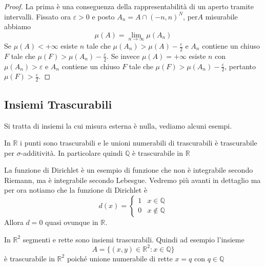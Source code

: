 \begin{proof}
    La prima è una conseguenza della rappresentabilità di un aperto tramite
intervalli. Fissato ora \(\varepsilon>0\) e posto \(A_{n} = A \cap
{(-n,n)}^{N}\), per\(A\) misurabile abbiamo
\[
    \mu(A) = \lim_{n \to \infty} \mu(A_{n})
\]
Se \(\mu(A) < +\infty\) esiste \(n\) tale che \(\mu(A_{n}) > \mu(A) -
\frac{\varepsilon}{2}\) e \(A_{n}\) contiene un chiuso \(F\) tale che \(\mu(F) >
\mu(A_{n}) - \frac{\varepsilon}{2}\). Se invece \(\mu(A) = +\infty\) esiste
\(n\) con \(\mu(A_{n}) > \varepsilon\) e \(A_{n}\) contiene un chiuso \(F\) tale
che \(\mu(F) > \mu(A_{n}) - \frac{\varepsilon}{2}\), pertanto \(\mu(F) >
\frac{\varepsilon}{2}\).

\end{proof}

\subsection{Insiemi Trascurabili}
Si tratta di insiemi la cui misura esterna è nulla, vediamo alcuni esempi.
\begin{example}
    In \(\mathbb{R}\) i punti sono trascurabili e le unioni numerabili di trascurabili è trascurabile per \(\sigma\)-additività.
    In particolare quindi \(\mathbb{Q}\) è trascurabile in \(\mathbb{R}\) 
\end{example}

La funzione di Dirichlet è un esempio di funzione che non è integrabile secondo
Riemann, ma è integrabile secondo Lebesgue. Vedremo più avanti in dettaglio ma
per ora notiamo che la funzione di Dirichlet è
\[
    d(x) = \begin{cases}
        1 & x \in \mathbb{Q}  \\
        0 & x \notin \mathbb{Q} 
    \end{cases}
\]
Allora \(d = 0\) quasi ovunque in \(\mathbb{R}\).

\begin{example}
    In \(\mathbb{R}^2\) segmenti e rette sono insiemi trascurabili. Quindi ad
    esempio l'insieme 
    \[
        A = \{(x, y) \in \mathbb{R}^2 : x \in \mathbb{Q}\} 
    \]
    è trascurabile in \(\mathbb{R}^2\) poiché unione numerabile di rette \(x=q\)
    con \(q \in \mathbb{Q}\) 
\end{example}

